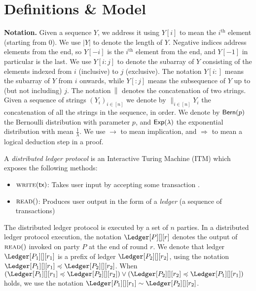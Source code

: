 \section{Definitions \& Model}

\noindent
\textbf{Notation.}
Given a sequence $Y$, we address it using $Y[i]$ to mean the $i^\text{th}$ element (starting from $0$).
We use $|Y|$ to denote the length of $Y$.
Negative indices address elements from the end, so $Y[-i]$ is the $i^\text{th}$ element from
the end, and $Y[-1]$ in particular is the last. We use $Y[i{:}j]$ to denote the subarray of $Y$
consisting of the elements indexed from $i$ (inclusive) to $j$ (exclusive). The notation $Y[i{:}]$ means the
subarray of $Y$ from $i$ onwards, while $Y[{:}j]$ means the subsequence of $Y$ up to (but not including) $j$.
The notation $\,\|\,$ denotes the concatenation of two strings.
Given a sequence of strings $(Y_i)_{i \in [n]}$ we denote by $\big\lVert_{i \in [n]} Y_i$ the concatenation
of all the strings in the sequence, in order. We denote by $\textsf{Bern}(p)$ the Bernoulli distribution with parameter $p$,
and $\textsf{Exp}(\lambda)$ the exponential distribution with mean $\frac{1}{\lambda}$.
We use $\rightarrow$ to mean implication, and $\Rightarrow$ to mean a logical
deduction step in a proof.

\begin{definition}
  A \emph{distributed ledger protocol} is an Interactive Turing Machine (ITM)
  which exposes the following methods:

  \begin{itemize}
    \item $\textsc{write}(\textsf{tx})$:
      Takes user input by accepting some transaction \tx.
    \item $\textsc{read}()$:
      Produces user output in the form of a \emph{ledger} (a sequence of transactions)
  \end{itemize}
\end{definition}

The distributed ledger protocol is executed by a set of $n$ parties.
In a distributed ledger protocol execution, the notation
$\Ledger[P][][r]$ denotes the output of $\textsc{read}()$
invoked on party $P$ at the end of round $r$.
We denote that ledger
$\Ledger[P_1][][r_1]$ is a prefix of ledger $\Ledger[P_2][][r_2]$,
using the notation
$\Ledger[P_1][][r_1] \preccurlyeq \Ledger[P_2][][r_2]$. When
$(\Ledger[P_1][][r_1] \preccurlyeq \Ledger[P_2][][r_2]) \lor (\Ledger[P_2][][r_2] \preccurlyeq \Ledger[P_1][][r_1])$ holds,
we use the notation $\Ledger[P_1][][r_1] \sim \Ledger[P_2][][r_2]$.

